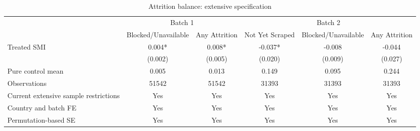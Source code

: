 \begin{table}[!htbp]
    \centering
    \caption{Attrition balance: extensive specification}
    \label{tab:attrition_extensive}
    \scriptsize
    \begin{adjustbox}{width=\textwidth}
    \begin{tabular}{lccccc}
    \toprule
     & \multicolumn{2}{c}{Batch 1} & \multicolumn{3}{c}{Batch 2} \\
    \cmidrule(lr){2-3} \cmidrule(lr){4-6}
     & Blocked/Unavailable & Any Attrition & Not Yet Scraped & Blocked/Unavailable & Any Attrition \\
    \midrule
    Treated SMI & 0.004* & 0.008* & -0.037* & -0.008 & -0.044 \\
     & (0.002) & (0.005) & (0.020) & (0.009) & (0.027) \\
    Pure control mean & 0.005 & 0.013 & 0.149 & 0.095 & 0.244 \\
    Observations & 51542 & 51542 & 31393 & 31393 & 31393 \\
    Current extensive sample restrictions & Yes & Yes & Yes & Yes & Yes \\
    Country and batch FE & Yes & Yes & Yes & Yes & Yes \\
    Permutation-based SE & Yes & Yes & Yes & Yes & Yes \\
    \bottomrule
    \end{tabular}
    \end{adjustbox}
\end{table}
